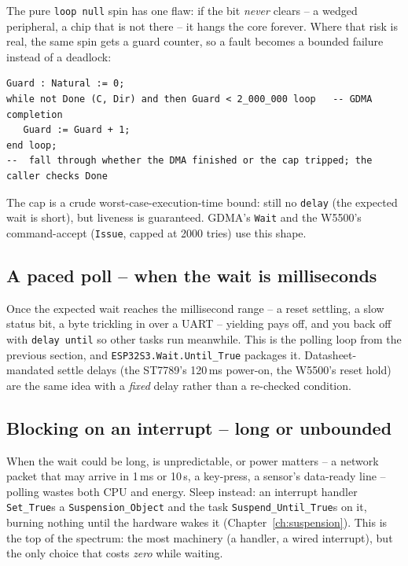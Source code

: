 The pure \texttt{loop null} spin has one flaw: if the bit \emph{never} clears -- a
wedged peripheral, a chip that is not there -- it hangs the core forever. Where
that risk is real, the same spin gets a guard counter, so a fault becomes a
bounded failure instead of a deadlock:

\begin{lstlisting}
Guard : Natural := 0;
while not Done (C, Dir) and then Guard < 2_000_000 loop   -- GDMA completion
   Guard := Guard + 1;
end loop;
--  fall through whether the DMA finished or the cap tripped; the caller checks Done
\end{lstlisting}

The cap is a crude worst-case-execution-time bound: still no \texttt{delay} (the
expected wait is short), but liveness is guaranteed. GDMA's \texttt{Wait} and the
W5500's command-accept (\texttt{Issue}, capped at 2000 tries) use this shape.

\subsection{A paced poll -- when the wait is milliseconds}

Once the expected wait reaches the millisecond range -- a reset settling, a slow
status bit, a byte trickling in over a UART -- yielding pays off, and you back off
with \texttt{delay until} so other tasks run meanwhile. This is the polling loop
from the previous section, and \texttt{ESP32S3.Wait.Until\_True} packages it.
Datasheet-mandated settle delays (the ST7789's 120\,ms power-on, the W5500's reset
hold) are the same idea with a \emph{fixed} delay rather than a re-checked
condition.

\subsection{Blocking on an interrupt -- long or unbounded}

When the wait could be long, is unpredictable, or power matters -- a network
packet that may arrive in 1\,ms or 10\,s, a key-press, a sensor's data-ready line
-- polling wastes both CPU and energy. Sleep instead: an interrupt handler
\texttt{Set\_True}s a \texttt{Suspension\_Object} and the task
\texttt{Suspend\_Until\_True}s on it, burning nothing until the hardware wakes it
(Chapter~\ref{ch:suspension}). This is the top of the spectrum: the most machinery
(a handler, a wired interrupt), but the only choice that costs \emph{zero} while
waiting.

